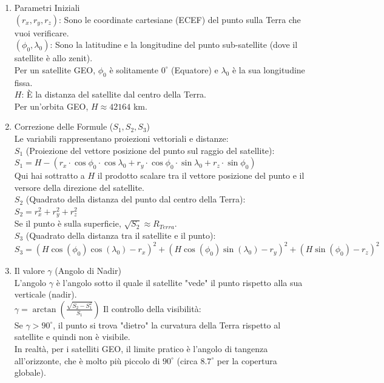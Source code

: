 \documentclass[a4paper,14pt]{article}
\begin{document}
\begin{enumerate}
\item Parametri Iniziali\\
\((r_{x},r_{y},r_{z})\): Sono le coordinate cartesiane (ECEF) del punto sulla Terra che vuoi verificare.\\
\((\phi _{0},\lambda _{0})\): Sono la latitudine e la longitudine del punto sub-satellite (dove il satellite è allo zenit).\\
Per un satellite GEO, \(\phi _{0}\) è solitamente \(0^{\circ }\) (Equatore) e \(\lambda _{0}\) è la sua longitudine fissa.\\
\(H\): È la distanza del satellite dal centro della Terra.\\
Per un'orbita GEO, \(H\approx 42164\) km.
\item Correzione delle Formule (\(S_{1},S_{2},S_{3}\))\\
Le variabili rappresentano proiezioni vettoriali e distanze:\\
\(S_{1}\) (Proiezione del vettore posizione del punto sul raggio del satellite):\\
\(S_{1}=H-(r_{x}\cdot \cos \phi _{0}\cdot \cos \lambda _{0}+r_{y}\cdot \cos \phi _{0}\cdot \sin \lambda _{0}+r_{z}\cdot \sin \phi _{0})\)\\
Qui hai sottratto a \(H\) il prodotto scalare tra il vettore posizione del punto e il versore della direzione del satellite.\\
\(S_{2}\) (Quadrato della distanza del punto dal centro della Terra):\\
\(S_{2}=r_{x}^{2}+r_{y}^{2}+r_{z}^{2}\)\\
Se il punto è sulla superficie, \(\sqrt{S_{2}}\approx R_{Terra}\).\\
\(S_{3}\) (Quadrato della distanza tra il satellite e il punto):\\
\(S_{3}=(H\cos (\phi _{0})\cos (\lambda _{0})-r_{x})^{2}+(H\cos (\phi _{0})\sin (\lambda _{0})-r_{y})^{2}+(H\sin (\phi _{0})-r_{z})^{2}\) \\
\item Il valore \(\gamma \) (Angolo di Nadir)\\
L'angolo \(\gamma \) è l'angolo sotto il quale il satellite "vede" il punto rispetto alla sua verticale (nadir).\\
\(\gamma =\arctan \left(\frac{\sqrt{S_{2}-S_{1}^{2}}}{S_{1}}\right)\)
Il controllo della visibilità:\\
Se \(\gamma >90^{\circ }\), il punto si trova "dietro" la curvatura della Terra rispetto al satellite e quindi non è visibile.\\
In realtà, per i satelliti GEO, il limite pratico è l'angolo di tangenza all'orizzonte, che è molto più piccolo di \(90^{\circ }\) (circa \(8.7^{\circ }\) per la copertura globale).
\end{enumerate}
\end{document}
